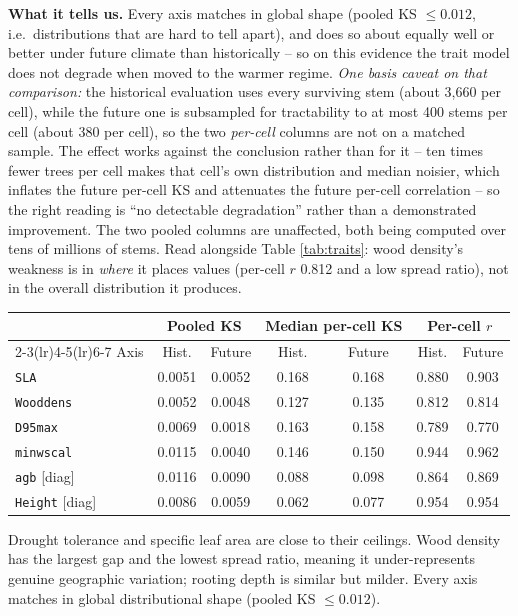\documentclass[11pt]{article}
\begin{document}
\begin{table}[h]
{\textbf{What it tells us.} Every axis matches in global shape (pooled KS $\le 0.012$, i.e.\ distributions that are hard to tell apart), and does so about equally well or better under future climate than historically -- so on this evidence the trait model does not degrade when moved to the warmer regime. \emph{One basis caveat on that comparison:} the historical evaluation uses every surviving stem (about 3{,}660 per cell), while the future one is subsampled for tractability to at most 400 stems per cell (about 380 per cell), so the two \emph{per-cell} columns are not on a matched sample. The effect works against the conclusion rather than for it -- ten times fewer trees per cell makes that cell's own distribution and median noisier, which inflates the future per-cell KS and attenuates the future per-cell correlation -- so the right reading is ``no detectable degradation'' rather than a demonstrated improvement. The two pooled columns are unaffected, both being computed over tens of millions of stems. Read alongside Table \ref{tab:traits}: wood density's weakness is in \emph{where} it places values (per-cell $r$ 0.812 and a low spread ratio), not in the overall distribution it produces.}
\label{tab:traits2}
\small
\begin{tabular}{lcccccc}
\toprule
& \multicolumn{2}{c}{Pooled KS} & \multicolumn{2}{c}{Median per-cell KS} & \multicolumn{2}{c}{Per-cell $r$} \\
\cmidrule(lr){2-3}\cmidrule(lr){4-5}\cmidrule(lr){6-7}
Axis & Hist. & Future & Hist. & Future & Hist. & Future \\
\midrule
\texttt{SLA} & 0.0051 & 0.0052 & 0.168 & 0.168 & 0.880 & 0.903 \\
\texttt{Wooddens} & 0.0052 & 0.0048 & 0.127 & 0.135 & 0.812 & 0.814 \\
\texttt{D95max} & 0.0069 & 0.0018 & 0.163 & 0.158 & 0.789 & 0.770 \\
\texttt{minwscal} & 0.0115 & 0.0040 & 0.146 & 0.150 & 0.944 & 0.962 \\
\texttt{agb} [diag] & 0.0116 & 0.0090 & 0.088 & 0.098 & 0.864 & 0.869 \\
\texttt{Height} [diag] & 0.0086 & 0.0059 & 0.062 & 0.077 & 0.954 & 0.954 \\
\bottomrule
\end{tabular}
\end{table}

Drought tolerance and specific leaf area are close to their ceilings. Wood density has the largest gap and the lowest spread ratio, meaning it under-represents genuine geographic variation; rooting depth is similar but milder. Every axis matches in global distributional shape (pooled KS $\le 0.012$).
\end{document}
